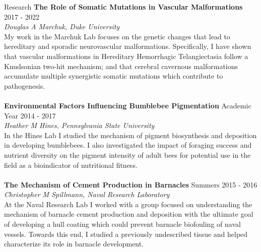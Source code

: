\documentclass{resume} %
\begin{document}
\begin{rSection}{Research}
{\bf The Role of Somatic Mutations in Vascular Malformations} \hfill {2017 - 2022} \\
\textit{Douglas A Marchuk, Duke University} \\
My work in the Marchuk Lab focuses on the genetic changes that lead to
hereditary and sporadic neurovascular malformations. Specifically, I have shown
that vascular malformations in Hereditary Hemorrhagic Telangiectasia follow a Knudsonian
two-hit mechanism; and that cerebral cavernous malformations accumulate multiple synergistic somatic
mutations which contribute to pathogenesis.  \\\\
{\bf Environmental Factors Influencing Bumblebee Pigmentation} \hfill {Academic Year 2014 - 2017} \\
\textit{Heather M Hines, Pennsylvania State University} \\
In the Hines Lab I studied the mechanism of pigment biosynthesis and deposition in developing bumblebees.
I also investigated the impact of foraging success and nutrient diversity on the pigment intensity of adult bees
for potential use in the field as a bioindicator of nutritional fitness. \\\\
{\bf The Mechanism of Cement Production in Barnacles} \hfill {Summers 2015 - 2016} \\
\textit{Christopher M Spillmann, Naval Research Laboratory} \\
At the Naval Research Lab I worked with a group focused on understanding the mechanism of
barnacle cement production and deposition with the ultimate goal of developing a hull coating which 
could prevent barnacle biofouling of naval vessels. Towards this end, I studied a previously
undescribed tissue and helped characterize its role in barnacle development. \\
\end{rSection}
\end{document}
